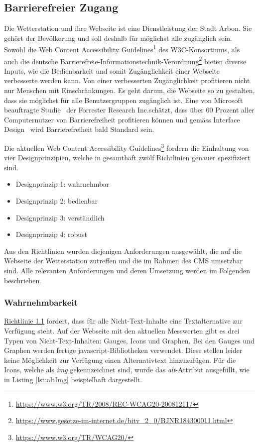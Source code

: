 \subsection{Barrierefreier Zugang}
Die Wetterstation und ihre Webseite ist eine Dienstleistung der Stadt Arbon. Sie gehört der Bevölkerung und soll deshalb für möglichst alle zugänglich sein. Sowohl die \flqq Web Content Accessibility Guidelines\frqq\footnote{ \url{https://www.w3.org/TR/2008/REC-WCAG20-20081211/}} des W3C-Konsortiums, als auch die deutsche \flqq  Barrierefreie-Informationstechnik-Verordnung\frqq\footnote{ \url{https://www.gesetze-im-internet.de/bitv_2_0/BJNR184300011.html}} bieten diverse Inputs, wie die Bedienbarkeit und somit Zugänglichkeit einer Webseite verbesserte werden kann. Von einer verbesserten Zugänglichkeit profitieren nicht nur Menschen mit Einschränkungen. Es geht darum, die Webseite so zu gestalten, dass sie möglichst für alle Benutzergruppen zugänglich ist. Eine von Microsoft beauftragte Studie~\cite{ForresterResearch2004E:Abilities} der \flqq Forrester Research Inc.\frqq schätzt, dass über 60 Prozent aller Computernutzer von Barrierefreiheit profitieren können und gemäss \flqq Interface Design\frqq ~\cite{ThesmannStephan2016ID:U} wird Barrierefreiheit bald Standard sein.

\noindent
Die aktuellen Web Content Accessibility Guidelines\footnote{\url{https://www.w3.org/TR/WCAG20/}} fordern die Einhaltung von vier Designprinzipien, welche in gesamthaft zwölf Richtlinien genauer spezifiziert sind.

\begin{itemize}
\item Designprinzip 1: wahrnehmbar
\item Designprinzip 2: bedienbar
\item Designprinzip 3: verständlich
\item Designprinzip 4: robust
\end{itemize}

\noindent
Aus den Richtlinien wurden diejenigen Anforderungen ausgewählt, die auf die Webseite der Wetterstation zutreffen und die im Rahmen des CMS umsetzbar sind. Alle relevanten Anforderungen und deren Umsetzung werden im Folgenden beschrieben.

\subsubsection*{Wahrnehmbarkeit}
\href{https://www.w3.org/Translations/WCAG20-de/#text-equiv}{Richtlinie 1.1} fordert, dass für alle Nicht-Text-Inhalte eine Textalternative zur Verfügung steht. Auf der Webseite mit den aktuellen Messwerten gibt es drei Typen von Nicht-Text-Inhalten: Gauges, Icons und Graphen. Bei den Gauges und Graphen werden fertige javascript-Bibliotheken verwendet. Diese stellen leider keine Möglichkeit zur Verfügung einen Alternativtext hinzuzufügen. Für die Icons, welche als \textit{img} gekennzeichnet sind, wurde das \textit{alt}-Attribut ausgefüllt, wie in Listing \ref{lst:altImg} beispielhaft dargestellt.

